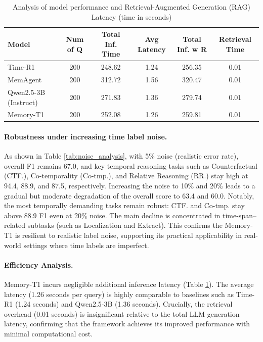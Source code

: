 \documentclass{article} %
\begin{document}
\begin{table}[t]
\centering
\caption{Analysis of model performance and Retrieval-Augmented Generation (RAG) Latency (time in seconds)}
\setlength{\tabcolsep}{5pt} %
\small %
\begin{tabular}{lccccc}
\toprule
\textbf{Model} &
\textbf{Num of Q} &
\textbf{Total Inf. Time} &
\textbf{Avg Latency} &
\textbf{Total Inf. w R} &
\textbf{Retrieval Time} \\
\midrule
Time-R1 & 200 & 248.62 & 1.24 & 256.35 & 0.01 \\
MemAgent  & 200 & 312.72 & 1.56 & 320.47 & 0.01 \\
Qwen2.5-3B (Instruct)  & 200 & 271.83 & 1.36 & 279.74 & 0.01 \\
Memory-T1  & 200 & 252.08 & 1.26 & 259.81 & 0.01 \\
\bottomrule
\end{tabular}
\label{tab:efficiency_analysis}
\end{table}

\paragraph{Robustness under increasing time label noise.} As shown in Table \ref{tab:noise_analysis}, with 5\% noise (realistic error rate), overall F1 remains 67.0, and key temporal reasoning tasks such as Counterfactual (CTF.), Co-temporality (Co-tmp.), and Relative Reasoning (RR.) stay high at 94.4, 88.9, and 87.5, respectively. Increasing the noise to 10\% and 20\% leads to a gradual but moderate degradation of the overall score to 63.4 and 60.0. Notably, the most temporally demanding tasks remain robust: CTF. and Co-tmp. stay above 88.9 F1 even at 20\% noise. The main decline is concentrated in time-span–related subtasks (such as Localization and Extract). This confirms the Memory-T1 is resilient to realistic label noise, supporting its practical applicability in real-world settings where time labels are imperfect.

\paragraph{Efficiency Analysis.} Memory-T1 incurs negligible additional inference latency (Table \ref{tab:efficiency_analysis}). The average latency (1.26 seconds per query) is highly comparable to baselines such as Time-R1 (1.24 seconds) and Qwen2.5-3B (1.36 seconds). Crucially, the retrieval overhead (0.01 seconds) is insignificant relative to the total LLM generation latency, confirming that the framework achieves its improved performance with minimal computational cost.
\end{document}
